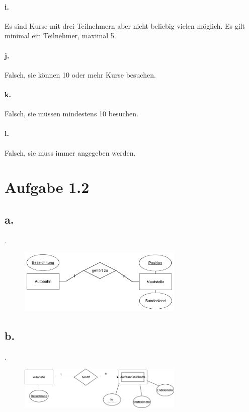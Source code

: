 \documentclass{article}
\begin{document}
		\paragraph*{i.}Es sind Kurse mit drei Teilnehmern aber nicht beliebig vielen möglich. Es gilt minimal ein Teilnehmer, maximal 5.
		
		\paragraph*{j.}Falsch, sie können 10 oder mehr Kurse besuchen.
		
		\paragraph*{k.}Falsch, sie müssen mindestens 10 besuchen.
		
		\paragraph*{l.}Falsch, sie muss immer angegeben werden.
	\newpage	
	\section*{Aufgabe 1.2}
		\subsection*{a.}
		.
			\begin{figure}[h]
				\includegraphics[width=0.7\textwidth]{aufgabe_1_2_a.png}
			\end{figure}
		
		\subsection*{b.}
		. 
			\begin{figure}[h]
				\includegraphics[width=0.7\textwidth]{aufgabe_1_2_b.png}
			\end{figure}
		
\end{document}
